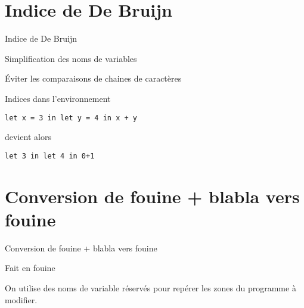 \documentclass{beamer}
\begin{document}
\section{Indice de De Bruijn}
\begin{frame}{Indice de De Bruijn}

  Simplification des noms de variables

  Éviter les comparaisons de chaines de caractères

  Indices dans l'environnement
 
  \texttt{let x = 3 in let y = 4 in x + y} 
	
	devient alors 
	
	\texttt{let 3 in let 4 in 0+1}

\end{frame}


\section{Conversion de fouine + blabla vers fouine}
\begin{frame}{Conversion de fouine + blabla vers fouine}

  Fait en fouine

  On utilise des noms de variable réservés pour repérer les zones du programme à modifier.
  
\end{frame}
\end{document}
